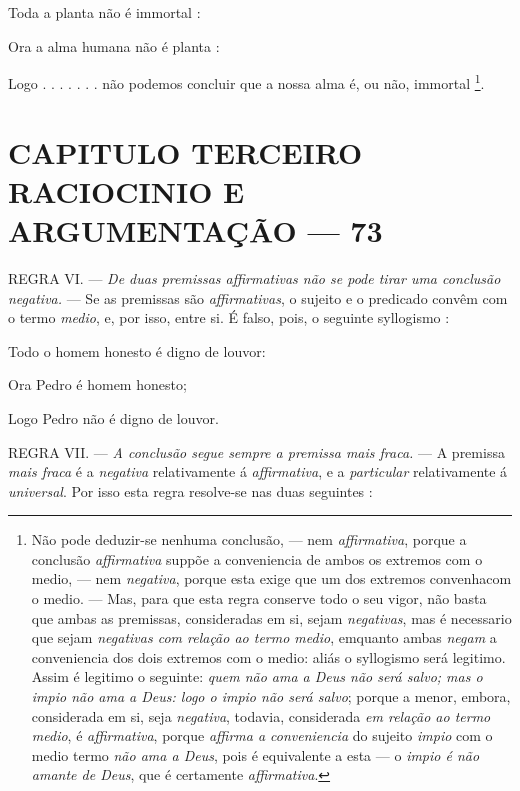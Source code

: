 Toda a planta não é immortal :

Ora a alma humana não é planta :

Logo . . . . . . . não podemos concluir que a nossa alma é, ou não, immortal \footnote{Não pode deduzir-se nenhuma conclusão, --- nem \emph{affirmativa}, porque a conclusão \emph{affirmativa} suppõe a conveniencia de ambos os extremos com o medio, --- nem \emph{negativa}, porque esta exige que um dos extremos convenhacom o medio. --- Mas, para que esta regra conserve todo o seu vigor, não basta que ambas as premissas, consideradas em si, sejam \emph{negativas}, mas é necessario que sejam \emph{negativas com relação ao termo medio}, emquanto ambas \emph{negam} a conveniencia dos dois extremos com o medio: aliás o syllogismo será legitimo. Assim é legitimo o seguinte: \emph{quem não ama a Deus não será salvo; mas o impio não ama a Deus: logo o impio não será salvo}; porque a menor, embora, considerada em si, seja \emph{negativa}, todavia, considerada \emph{em relação ao termo medio}, é \emph{affirmativa}, porque \emph{affirma a conveniencia} do sujeito \emph{impio} com o medio termo \emph{não ama a Deus}, pois é equivalente a esta --- o \emph{impio é não amante de Deus}, que é certamente \emph{affirmativa}.}.


\chapter*{CAPITULO TERCEIRO\\[0.3em]\large RACIOCINIO E ARGUMENTAÇÃO --- 73}

     \textsc{REGRA} VI. --- \emph{De duas premissas affirmativas não se pode tirar uma conclusão negativa.} --- Se as premissas são \emph{affirmativas}, o sujeito e o predicado convêm com o termo \emph{medio}, e, por isso, entre si. É falso, pois, o seguinte syllogismo :

Todo o homem honesto é digno de louvor:

Ora Pedro é homem honesto;

Logo Pedro não é digno de louvor.

\textsc{REGRA} VII. --- \emph{A conclusão segue sempre a premissa mais fraca.} --- A premissa \emph{mais fraca} é a \emph{negativa} relativamente á \emph{affirmativa}, e a \emph{particular} relativamente á \emph{universal}. Por isso esta regra resolve-se nas duas seguintes :

